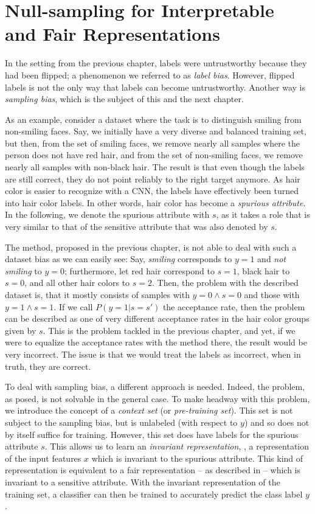 \section{Null-sampling for Interpretable and Fair Representations}\label{sec:nifr}
In the setting from the previous chapter,
labels were untrustworthy because they had been flipped;
a phenomenon we referred to as \emph{label bias}.
However, flipped labels is not the only way that labels can become untrustworthy.
Another way is \emph{sampling bias}, which is the subject of this and the next chapter.

As an example, consider a dataset where the task is to distinguish smiling from non-smiling faces.
Say, we initially have a very diverse and balanced training set,
but then, from the set of smiling faces, we remove nearly all samples where the person does not have red hair,
and from the set of non-smiling faces, we remove nearly all samples with non-black hair.
The result is that even though the labels are still correct, they do not point reliably to the right target anymore.
As hair color is easier to recognize with a \ac{CNN}, the labels have effectively been turned into hair color labels.
In other words, hair color has become a \emph{spurious attribute}.
In the following, we denote the spurious attribute with \(s\),
as it takes a role that is very similar to that of the sensitive attribute that was also denoted by \(s\).

The method, proposed in the previous chapter,
is not able to deal with such a dataset bias as we can easily see:
Say, \emph{smiling} corresponds to \(y=1\) and \emph{not smiling} to \(y=0\);
furthermore, let red hair correspond to \(s=1\), black hair to \(s=0\), and all other hair colors to \(s=2\).
Then, the problem with the described dataset is, that it mostly consists of samples with \(y=0\wedge s=0\)
and those with \(y=1\wedge s=1\).
If we call \(P(y=1|s=s')\) the acceptance rate,
then the problem can be described as one of very different acceptance rates in the hair color groups given by \(s\).
This is the problem tackled in the previous chapter,
and yet, if we were to equalize the acceptance rates with the method there,
the result would be very incorrect.
The issue is that we would treat the labels as incorrect, when in truth, they are correct.

To deal with sampling bias, a different approach is needed.
Indeed, the problem, as posed, is not solvable in the general case.
To make headway with this problem, we introduce the concept of a \emph{context set} (or \emph{pre-training set}).
This set is not subject to the sampling bias,
but is unlabeled (with respect to $y$) and so does not by itself suffice for training.
However, this set does have labels for the spurious attribute \(s\).
This allows us to learn an \emph{invariant representation},
\ie, a representation of the input features \(x\) which is invariant to the spurious attribute.
This kind of representation is equivalent to a fair representation -- as described in  --
which is invariant to a sensitive attribute.
With the invariant representation of the training set,
a classifier can then be trained to accurately predict the class label \(y\).

